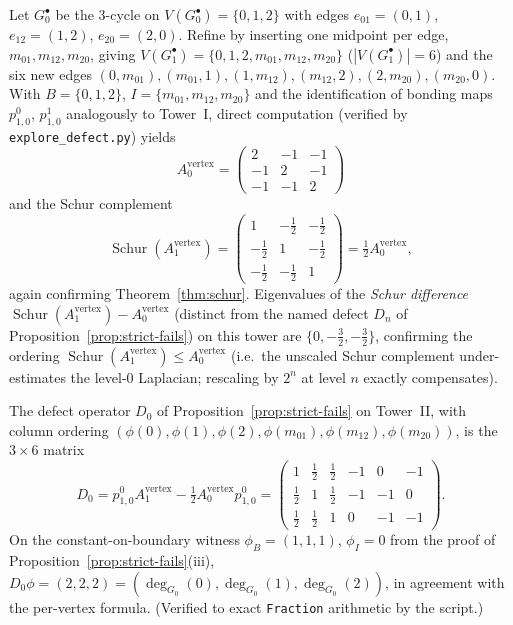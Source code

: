 \documentclass[11pt]{article}
\theoremstyle{plain}
\theoremstyle{definition}
\theoremstyle{remark}
\newcommand{\Schur}{\operatorname{Schur}}
\begin{document}
Let $G_0^{\bullet}$ be the 3-cycle on
$V(G_0^{\bullet}) = \{0, 1, 2\}$ with edges
$e_{01} = (0, 1)$, $e_{12} = (1, 2)$, $e_{20} = (2, 0)$. Refine by
inserting one midpoint per edge, $m_{01}, m_{12}, m_{20}$, giving
$V(G_1^{\bullet}) = \{0, 1, 2, m_{01}, m_{12}, m_{20}\}$
($|V(G_1^{\bullet})| = 6$) and the six new edges
$(0, m_{01}), (m_{01}, 1), (1, m_{12}), (m_{12}, 2), (2, m_{20}), (m_{20}, 0)$.
With $B = \{0, 1, 2\}$, $I = \{m_{01}, m_{12}, m_{20}\}$ and the
identification of bonding maps
$p^{0}_{1, 0}$, $p^{1}_{1, 0}$ analogously to Tower~I, direct
computation (verified by
\texttt{explore\_defect.py}) yields
\[
   A_0^{\mathrm{vertex}} =
   \begin{pmatrix} 2 & -1 & -1 \\ -1 & 2 & -1 \\ -1 & -1 & 2 \end{pmatrix}
\]
and the Schur complement
\[
   \Schur(A_1^{\mathrm{vertex}}) =
   \begin{pmatrix} 1 & -\tfrac12 & -\tfrac12 \\ -\tfrac12 & 1 & -\tfrac12 \\ -\tfrac12 & -\tfrac12 & 1 \end{pmatrix}
   = \tfrac12 A_0^{\mathrm{vertex}},
\]
again confirming Theorem~\ref{thm:schur}. Eigenvalues of the
\emph{Schur difference}
$\Schur(A_1^{\mathrm{vertex}}) - A_0^{\mathrm{vertex}}$ (distinct
from the named defect $D_n$ of Proposition~\ref{prop:strict-fails})
on this tower are $\{0, -\tfrac32, -\tfrac32\}$, confirming the
ordering $\Schur(A_1^{\mathrm{vertex}}) \le A_0^{\mathrm{vertex}}$
(i.e.\ the unscaled Schur complement under-estimates the level-$0$
Laplacian; rescaling by $2^n$ at level $n$ exactly compensates).

The defect operator $D_0$ of Proposition~\ref{prop:strict-fails}
on Tower~II, with column ordering
$(\phi(0), \phi(1), \phi(2), \phi(m_{01}), \phi(m_{12}), \phi(m_{20}))$,
is the $3 \times 6$ matrix
\[
   D_0
   = p^{0}_{1, 0} A_1^{\mathrm{vertex}} - \tfrac12 A_0^{\mathrm{vertex}} p^{0}_{1, 0}
   = \begin{pmatrix}
       1 & \tfrac12 & \tfrac12 & -1 & 0 & -1 \\
       \tfrac12 & 1 & \tfrac12 & -1 & -1 & 0 \\
       \tfrac12 & \tfrac12 & 1 & 0 & -1 & -1
     \end{pmatrix}.
\]
On the constant-on-boundary witness $\phi_B = (1, 1, 1)$,
$\phi_I = 0$ from the proof of Proposition~\ref{prop:strict-fails}(iii),
$D_0 \phi = (2, 2, 2) = (\deg_{G_0}(0), \deg_{G_0}(1), \deg_{G_0}(2))$,
in agreement with the per-vertex formula. (Verified to exact
\texttt{Fraction} arithmetic by the script.)
\end{document}
